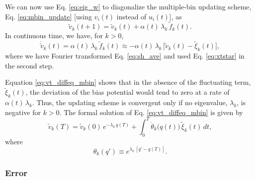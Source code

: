 \documentclass[preprint, superscriptaddress, floatfix]{revtex4-1}
\begin{document}
We can now use Eq. \eqref{eq:eig_w} to diagonalize
the multiple-bin updating scheme,
Eq. \eqref{eq:mbin_update}
[using $v_i(t)$ instead of $u_i(t)$],
as
%
\begin{equation}
  {\tilde v}_k(t + 1) =
  {\tilde v}_k(t) + \alpha(t) \, \lambda_k \,
  {\tilde f}_k(t)
  .
  \label{eq:vkupdate}
\end{equation}
%
In continuous time, we have, for $k > 0$,
%
\begin{equation}
  \dot{\tilde v}_k(t)
  =
  \alpha(t) \, \lambda_k \, {\tilde f}_k(t)
  \approx
  -\alpha(t) \, \lambda_k \,
  \bigl[ {\tilde v}_k(t) - {\tilde \xi}_k(t) \bigr]
  ,
  \label{eq:vt_diffeq_mbin}
\end{equation}
%
where
we have Fourier transformed Eq. \eqref{eq:sh_ave}
and used Eq. \eqref{eq:xtstar}
in the second step.

Equation \eqref{eq:vt_diffeq_mbin} shows that
in the absence of the fluctuating term, $\tilde \xi_k(t)$,
the deviation of the bias potential would tend to zero
at a rate of $\alpha(t) \, \lambda_k$.
%
Thus, the updating scheme is convergent
only if no eigenvalue, $\lambda_k$, is negative
for $k > 0$.
%
%
The formal solution of Eq. \eqref{eq:vt_diffeq_mbin}
is given by
\begin{equation}
  \tilde v_k(T)
  =
  \tilde v_k(0) \, e^{-\lambda_k \, q(T)}
  +
  \int_0^T
    \dot{\theta}_k\bigl( q(t) \bigr) \, \tilde\xi_k(t) \, dt
  ,
  \label{eq:vk_solution}
\end{equation}
where
\begin{equation}
  \theta_k(q') \equiv e^{\lambda_k \, [q' - q(T)]}
  .
  \label{eq:uk_def}
\end{equation}





\subsubsection{Error}
\end{document}
